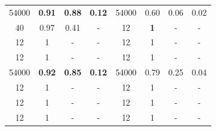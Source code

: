 \begin{table}[H]
\begin{tabular}{cccc|cccc}
	54000	& \textbf{0.91}	& \textbf{0.88}	& \textbf{0.12}	& 54000	& 0.60	& 0.06	& 0.02 \\
	40		& 0.97	& 0.41	& -		& 12	& \textbf{1}	& -		& - \\
	12		& 1		& -		& -		& 12	& 1		& -		& - \\
	12		& 1		& -		& -		& 12	& 1		& -		& - \\
	54000	& \textbf{0.92}	& \textbf{0.85}	& \textbf{0.12}	& 54000	& 0.79	& 0.25	& 0.04 \\
	12		& 1		& -		& -		& 12	& 1		& -		& - \\
	12		& 1		& -		& -		& 12	& 1		& -		& - \\
	12		& 1		& -		& -		& 12	& 1		& -		& - \\
   \end{tabular}
\end{table}